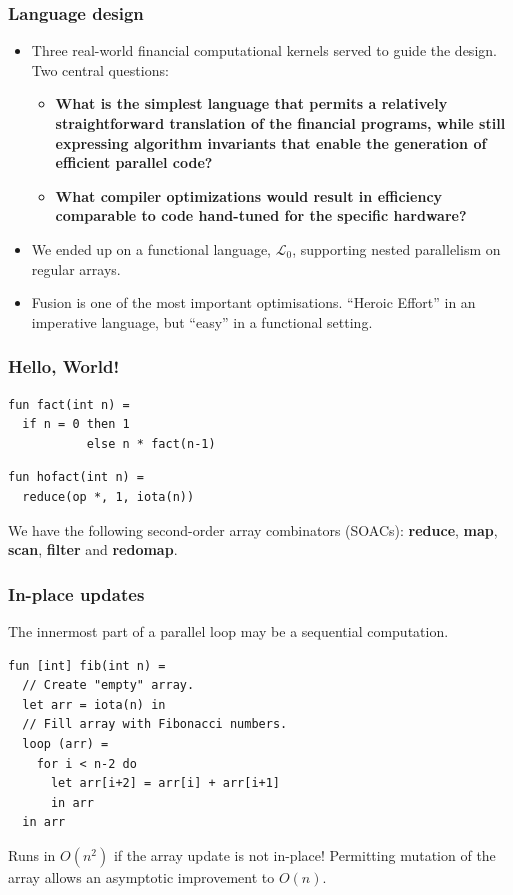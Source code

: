 \documentclass{beamer}
\newcommand{\LO}{$\mathcal{L}_0$}
\begin{document}
\begin{frame}
  \frametitle{Language design}

  \begin{itemize}
  \item Three real-world financial computational kernels served to
    guide the design.  Two central questions:
    \begin{itemize}
    \item \textbf{What is the simplest language that permits a
        relatively straightforward translation of the financial
        programs, while still expressing algorithm invariants that
        enable the generation of efficient parallel code?}
    \item \textbf{What compiler optimizations would result in efficiency
        comparable to code hand-tuned for the specific hardware?}
    \end{itemize}
  \item We ended up on a functional language, \LO{}, supporting nested
    parallelism on regular arrays.
  \item Fusion is one of the most important optimisations.  ``Heroic
    Effort'' in an imperative language, but ``easy'' in a functional
    setting.
  \end{itemize}
\end{frame}

\begin{frame}[fragile]
  \frametitle{Hello, World!}

\begin{lstlisting}
fun fact(int n) =
  if n = 0 then 1
           else n * fact(n-1)
\end{lstlisting}

\begin{lstlisting}
fun hofact(int n) =
  reduce(op *, 1, iota(n))
\end{lstlisting}

We have the following second-order array combinators (SOACs):
\textbf{reduce}, \textbf{map}, \textbf{scan}, \textbf{filter} and
\textbf{redomap}.

\end{frame}

\begin{frame}[fragile]
  \frametitle{In-place updates}

  The innermost part of a parallel loop may be a sequential
  computation.

\begin{lstlisting}
fun [int] fib(int n) =
  // Create "empty" array.
  let arr = iota(n) in
  // Fill array with Fibonacci numbers.
  loop (arr) =
    for i < n-2 do
      let arr[i+2] = arr[i] + arr[i+1]
      in arr
  in arr
\end{lstlisting}

Runs in $O(n^{2})$ if the array update is not in-place!  Permitting
mutation of the array allows an asymptotic improvement to $O(n)$.

\end{frame}
\end{document}
